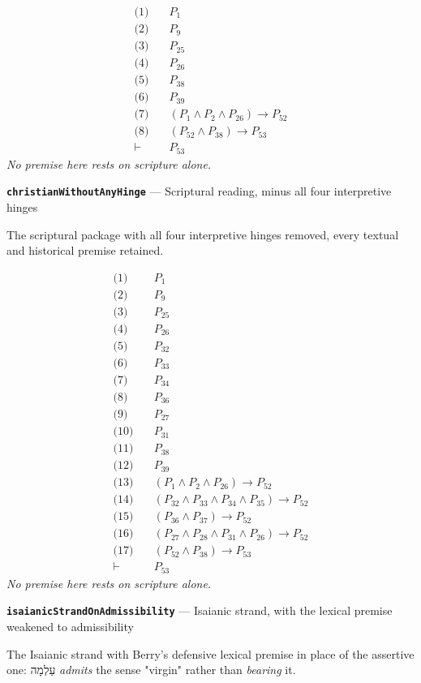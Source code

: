 \documentclass[11pt]{article}
\begin{document}
\begin{align*}
  \text{(1)} \quad & P_{1} \\
  \text{(2)} \quad & P_{9} \\
  \text{(3)} \quad & P_{25} \\
  \text{(4)} \quad & P_{26} \\
  \text{(5)} \quad & P_{38} \\
  \text{(6)} \quad & P_{39} \\
  \text{(7)} \quad & (P_{1} \land P_{2} \land P_{26}) \rightarrow P_{52} \\
  \text{(8)} \quad & (P_{52} \land P_{38}) \rightarrow P_{53} \\
  \vdash \quad & P_{53}
\end{align*}
\emph{No premise here rests on scripture alone.}
\par\medskip\noindent\textbf{\texttt{christian\allowbreak{}Without\allowbreak{}Any\allowbreak{}Hinge}} --- Scriptural reading, minus all four interpretive hinges\par\nobreak\noindent
The scriptural package with all four interpretive hinges removed, every textual and historical premise retained.

\begin{align*}
  \text{(1)} \quad & P_{1} \\
  \text{(2)} \quad & P_{9} \\
  \text{(3)} \quad & P_{25} \\
  \text{(4)} \quad & P_{26} \\
  \text{(5)} \quad & P_{32} \\
  \text{(6)} \quad & P_{33} \\
  \text{(7)} \quad & P_{34} \\
  \text{(8)} \quad & P_{36} \\
  \text{(9)} \quad & P_{27} \\
  \text{(10)} \quad & P_{31} \\
  \text{(11)} \quad & P_{38} \\
  \text{(12)} \quad & P_{39} \\
  \text{(13)} \quad & (P_{1} \land P_{2} \land P_{26}) \rightarrow P_{52} \\
  \text{(14)} \quad & (P_{32} \land P_{33} \land P_{34} \land P_{35}) \rightarrow P_{52} \\
  \text{(15)} \quad & (P_{36} \land P_{37}) \rightarrow P_{52} \\
  \text{(16)} \quad & (P_{27} \land P_{28} \land P_{31} \land P_{26}) \rightarrow P_{52} \\
  \text{(17)} \quad & (P_{52} \land P_{38}) \rightarrow P_{53} \\
  \vdash \quad & P_{53}
\end{align*}
\emph{No premise here rests on scripture alone.}
\par\medskip\noindent\textbf{\texttt{isaianic\allowbreak{}Strand\allowbreak{}On\allowbreak{}Admissibility}} --- Isaianic strand, with the lexical premise weakened to admissibility\par\nobreak\noindent
The Isaianic strand with Berry's defensive lexical premise in place of the assertive one: עַלְמָה \emph{admits} the sense "virgin" rather than \emph{bearing} it.
\end{document}
